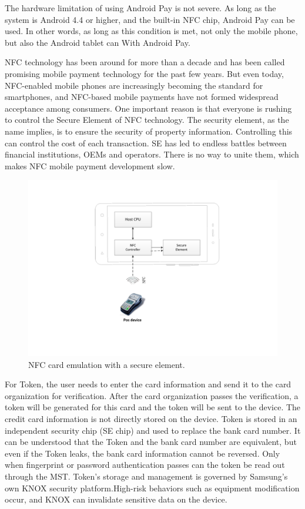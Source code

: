 \documentclass[journal]{IEEEtran}
\begin{document}
The hardware limitation of using Android Pay is not severe. As long as the system is Android 4.4 or higher, and the built-in NFC chip, Android Pay can be used. In other words, as long as this condition is met, not only the mobile phone, but also the Android tablet can With Android Pay.


NFC technology has been around for more than a decade and has been called promising mobile payment technology for the past few years. But even today, NFC-enabled mobile phones are increasingly becoming the standard for smartphones, and NFC-based mobile payments have not formed widespread acceptance among consumers. One important reason is that everyone is rushing to control the Secure Element of NFC technology. The security element, as the name implies, is to ensure the security of property information. Controlling this can control the cost of each transaction. SE has led to endless battles between financial institutions, OEMs and operators. There is no way to unite them, which makes NFC mobile payment development slow.

\begin{figure}[htbp]
\centerline{\includegraphics[scale=0.6]{NFC_se.pdf}}
\caption{NFC card emulation with a secure element.}
\label{fig}
\end{figure}

For Token, the user needs to enter the card information and send it to the card organization for verification. After the card organization passes the verification, a token will be generated for this card and the token will be sent to the device. The credit card information is not directly stored on the device. Token is stored in an independent security chip (SE chip) and used to replace the bank card number. It can be understood that the Token and the bank card number are equivalent, but even if the Token leaks, the bank card information cannot be reversed. Only when fingerprint or password authentication passes can the token be read out through the MST. Token's storage and management is governed by Samsung's own KNOX security platform.High-risk behaviors such as equipment modification occur, and KNOX can invalidate sensitive data on the device.
\end{document}
